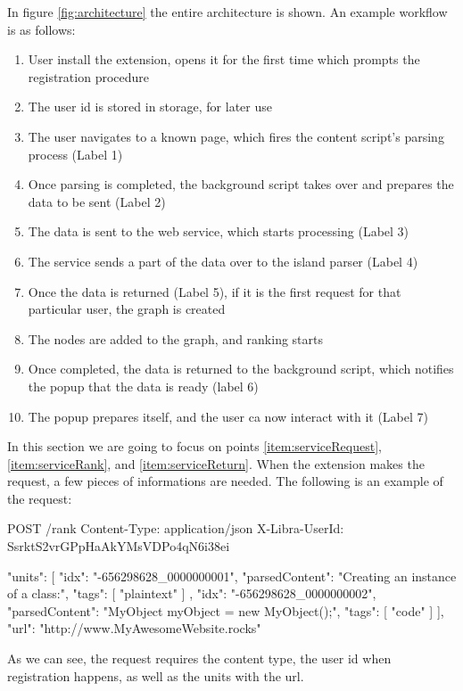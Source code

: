 \noindent In figure \ref{fig:architecture} the entire architecture is shown. An example workflow is as follows:
\begin{enumerate}
\item User install the extension, opens it for the first time which prompts the registration procedure
\item The user id is stored in storage, for later use
\item The user navigates to a known page, which fires the content script's parsing process (Label 1)
\item Once parsing is completed, the background script takes over and prepares the data to be sent (Label 2)
\item The data is sent to the web service, which starts processing (Label 3) \label{item:serviceRequest}
\item The service sends a part of the data over to the island parser (Label 4)
\item Once the data is returned (Label 5), if it is the first request for that particular user, the graph is created
\item The nodes are added to the graph, and ranking starts \label{item:serviceRank} 
\item Once completed, the data is returned to the background script, which notifies the popup that the data is ready (label 6) \label{item:serviceReturn}
\item The popup prepares itself, and the user ca now interact with it (Label 7)
\end{enumerate}

In this section we are going to focus on points \ref{item:serviceRequest}, \ref{item:serviceRank}, and \ref{item:serviceReturn}. When the extension makes the request, a few pieces of informations are needed. The following is an example of the request:
\begin{jsoncode}
POST /rank
Content-Type: application/json
X-Libra-UserId: SsrktS2vrGPpHaAkYMsVDPo4qN6i38ei

{
  "units": [
    {
      "idx": "-656298628_0000000001",
      "parsedContent": "Creating an instance of a class:",
      "tags": [
        "plaintext"
      ]
    },
    {
      "idx": "-656298628_0000000002",
      "parsedContent": "MyObject myObject = new MyObject();",
      "tags": [
        "code"
      ]
    }
  ],
  "url": "http://www.MyAwesomeWebsite.rocks"
}
\end{jsoncode}

As we can see, the request requires the content type, the user id when registration happens, as well as the units with the url. 


